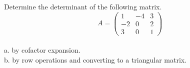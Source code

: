 \documentclass{ximera}
\author{Parisa Fatheddin}
\begin{document}
\begin{exercise}

Determine the determinant of the following matrix. 
\[
A= \begin{pmatrix}
1 & -4 & 3\\
-2 & 0 & 2\\
3 & 0 & 1 
\end{pmatrix}
\]\\

a. by cofactor expansion.\\

b. by row operations and converting to a triangular matrix. 





















\end{exercise}
\end{document}
